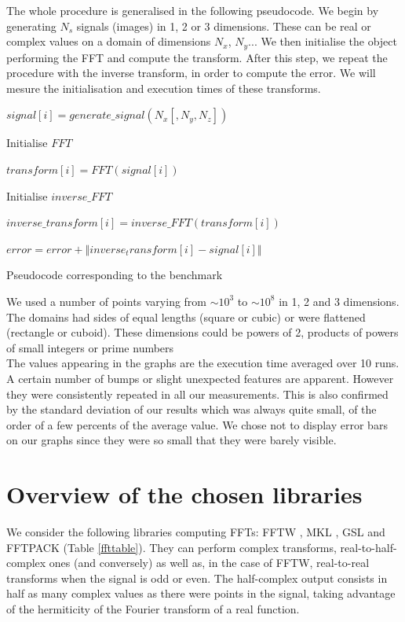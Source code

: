\documentclass[12pt, a4paper]{article}
\begin{document}
The whole procedure is generalised in the following pseudocode. We begin by generating $N_s$ signals (images) in 1, 2 or 3 dimensions. These can be real or complex values on a domain of dimensions $N_x$, $N_y$... We then initialise the object performing the FFT and compute the transform. After this step, we repeat the procedure with the inverse transform, in order to compute the error. We will mesure the initialisation and execution times of these transforms.
\begin{algorithm}[H]
\centering
\begin{algorithmic}
        \STATE  $signal[i]=generate\_signal(N_x [,N_y, N_z])$
        \ENDFOR

        \STATE Initialise $FFT$

        \STATE  $transform[i]=FFT(signal[i])$
        \ENDFOR

        \STATE Initialise $inverse\_FFT$

         \STATE $inverse\_transform[i]=inverse\_FFT(transform[i])$
        \ENDFOR

          \STATE   $error=error+\left\Vert inverse_transform[i]-signal[i]\right\Vert$
        \ENDFOR
\end{algorithmic}
\caption{Pseudocode corresponding to the benchmark}
\label{PSEUDOCODE}
\end{algorithm}

We used a number of points varying from $\sim 10^3$ to $\sim 10^8$ in 1, 2 and 3 dimensions. The domains had sides of equal lengths (square or cubic) or were flattened (rectangle or cuboid). These dimensions could be powers of 2, products of powers of small integers or prime numbers\\

The values appearing in the graphs are the execution time averaged over 10 runs. A certain number of bumps or slight unexpected features are apparent. However they were consistently repeated in all our measurements. This is also confirmed by the standard deviation of our results which was always quite small, of the order of a few percents of the average value. We chose not to display error bars on our graphs since they were so small that they were barely visible. 

\section{Overview of the chosen libraries}
We consider the following libraries computing FFTs: FFTW \cite{fftw}, MKL \cite{mkl}, GSL \cite{gsl} and FFTPACK \cite{fftpack} (Table \ref{ffttable}). They can perform complex transforms, real-to-half-complex ones (and conversely) as well as, in the case of FFTW, real-to-real transforms when the signal is odd or even. The half-complex output consists in half as many complex values as there were points in the signal, taking advantage of the hermiticity of the Fourier transform of a real function.\\
\end{document}
